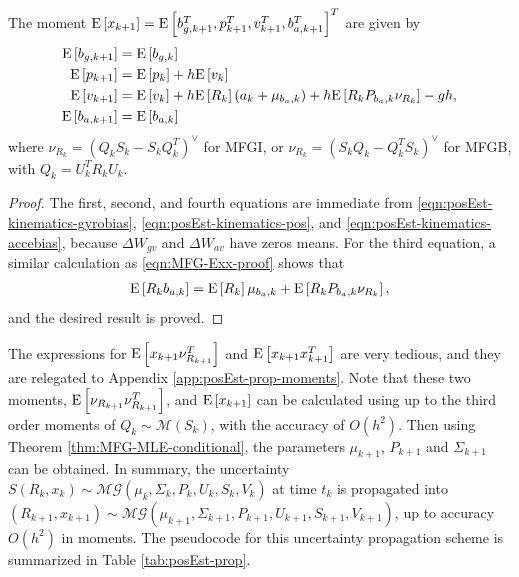 \begin{theorem} \label{thm:posEst-prop-Ex}
	The moment $\mathrm{E}\left[ x_{k+1} \right] = \mathrm{E}\left[  b_{g,k+1}^T, p_{k+1}^T, v_{k+1}^T, b_{a,k+1}^T \right]^T$ are given by
	\begin{align}
		\mathrm{E}\left[ b_{g,k+1} \right] &= \mathrm{E}\left[ b_{g,k} \right] \\
		\mathrm{E}\left[ p_{k+1} \right] &= \mathrm{E}\left[ p_k \right] + h\mathrm{E}\left[ v_k \right] \\
		\mathrm{E}\left[ v_{k+1} \right] &= \mathrm{E}\left[ v_k \right] + h\mathrm{E}\left[ R_k \right](a_k+\mu_{b_a,k}) + h\mathrm{E}\left[ R_kP_{b_a,k}\nu_{R_k} \right] - gh, \\
		\mathrm{E}\left[ b_{a,k+1} \right] &= \mathrm{E}\left[ b_{a,k} \right]
	\end{align}
	where $\nu_{R_k} = (Q_kS_k-S_kQ_k^T)^\vee$ for MFGI, or $\nu_{R_k} = (S_kQ_k-Q_k^TS_k)^\vee$ for MFGB, with $Q_k = U_k^TR_kU_k$.
\end{theorem}
\begin{proof}
	The first, second, and fourth equations are immediate from \eqref{eqn:posEst-kinematics-gyrobias}, \eqref{eqn:posEst-kinematics-pos}, and \eqref{eqn:posEst-kinematics-accebias}, because $\Delta W_{gv}$ and $\Delta W_{av}$ have zeros means.
	For the third equation, a similar calculation as \eqref{eqn:MFG-Exx-proof} shows that
	\begin{align*}
		\mathrm{E}\left[ R_kb_{a,k} \right] = \mathrm{E}\left[ R_k \right]\mu_{b_a,k} + \mathrm{E}\left[ R_kP_{b_a,k}\nu_{R_k} \right],
	\end{align*}
	and the desired result is proved.
\end{proof}

The expressions for $\mathrm{E}\left[ x_{k+1}\nu_{R_{k+1}}^T \right]$ and $\mathrm{E}\left[ x_{k+1}x_{k+1}^T \right]$ are very tedious, and they are relegated to Appendix \ref{app:posEst-prop-moments}.
Note that these two moments, $\mathrm{E}\left[ \nu_{R_{k+1}}\nu_{R_{k+1}}^T \right]$, and $\mathrm{E}\left[ x_{k+1} \right]$ can be calculated using up to the third order moments of $Q_k\sim\mathcal{M}(S_k)$, with the accuracy of $O(h^2)$.
Then using Theorem \ref{thm:MFG-MLE-conditional}, the parameters $\mu_{k+1}$, $P_{k+1}$ and $\Sigma_{k+1}$ can be obtained.
In summary, the uncertainty $S(R_k,x_k) \sim \mathcal{MG}(\mu_k, \Sigma_k, P_k, U_k, S_k, V_k)$ at time $t_k$ is propagated into $(R_{k+1},x_{k+1}) \sim \mathcal{MG}(\mu_{k+1},\allowbreak \Sigma_{k+1},\allowbreak P_{k+1},\allowbreak U_{k+1},\allowbreak S_{k+1},\allowbreak V_{k+1})$, up to accuracy $O(h^2)$ in moments.
The pseudocode for this uncertainty propagation scheme is summarized in Table \ref{tab:posEst-prop}.

